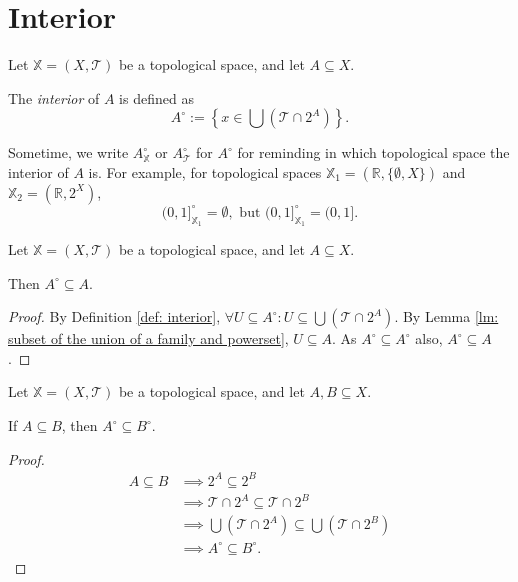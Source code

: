 \section{Interior}


\begin{definition}
	\label{def: interior}
	
	Let $\mathbb X = (X, \mathcal T)$ be a topological space, and let $A \subseteq X$.
	
	The \textit{interior} of $A$ is defined as
	$$
	A^\circ := \left\{ x \in \bigcup (\mathcal T \cap 2^A) \right\}.
	$$
\end{definition}

\begin{note}
	Sometime, we write $A^\circ_\mathbb X$ or $A^\circ_\mathcal T$ for $A^\circ$ for reminding in which topological space the interior of $A$ is. For example, for topological spaces $\mathbb X_1 = (\mathbb R, \{\emptyset, X\})$ and $\mathbb X_2 = (\mathbb R, 2^X)$,
	$$
	(0,1]^\circ_{\mathbb X_1} = \emptyset, \text{ but } (0,1]^\circ_{\mathbb X_1} = (0,1].
	$$
\end{note}


\begin{lemma}
	\label{lm: interior: subset of the set}
	Let $\mathbb X = (X, \mathcal T)$ be a topological space, and let $A \subseteq X$.
	
	Then $A^\circ \subseteq A$.
	
	\begin{proof}
		By Definition \ref{def: interior}, $\forall U \subseteq A^\circ: U \subseteq \bigcup(\mathcal T \cap 2^A)$. By Lemma \ref{lm: subset of the union of a family and powerset}, $U \subseteq A$. As $A^\circ \subseteq A^\circ$ also, $A^\circ \subseteq A$.
	\end{proof}
\end{lemma}


\begin{lemma}
	Let $\mathbb X = (X, \mathcal T)$ be a topological space, and let $A, B \subseteq X$.
	
	If $A \subseteq B$, then $A^\circ \subseteq B^\circ$.
	
	\begin{proof}
		$$
		\begin{aligned}
			A \subseteq B &\implies 2^A \subseteq 2^B \\
			&\implies \mathcal T \cap 2^A \subseteq \mathcal T \cap 2^B \\
			&\implies \bigcup (\mathcal T \cap 2^A) \subseteq \bigcup (\mathcal T \cap 2^B) \\
			&\implies A^\circ \subseteq B^\circ.
		\end{aligned}
		$$
	\end{proof}
\end{lemma}


